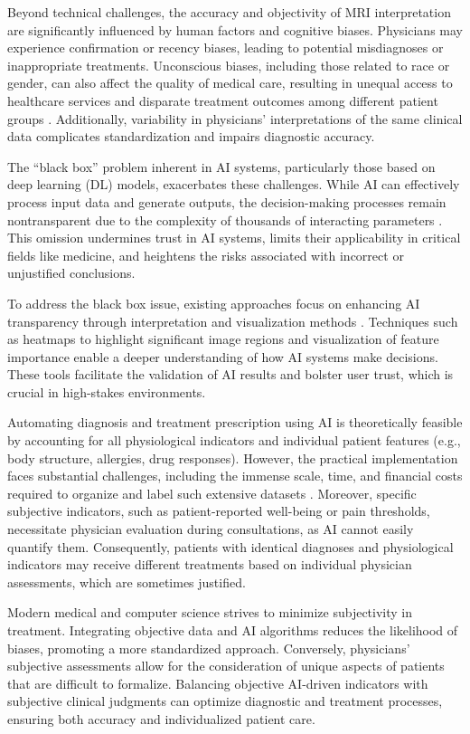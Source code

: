 \documentclass[fleqn,10pt]{wlscirep}
\begin{document}
Beyond technical challenges, the accuracy and objectivity of MRI interpretation are significantly influenced by human factors and cognitive biases. Physicians may experience confirmation or recency biases, leading to potential misdiagnoses or inappropriate treatments. Unconscious biases, including those related to race or gender, can also affect the quality of medical care, resulting in unequal access to healthcare services and disparate treatment outcomes among different patient groups \cite{DeBenedectis:2022,Meidert:2023}. Additionally, variability in physicians’ interpretations of the same clinical data complicates standardization and impairs diagnostic accuracy.

The “black box” problem inherent in AI systems, particularly those based on deep learning (DL) models, exacerbates these challenges. While AI can effectively process input data and generate outputs, the decision-making processes remain nontransparent due to the complexity of thousands of interacting parameters \cite{Radiuk:2024a}. This omission undermines trust in AI systems, limits their applicability in critical fields like medicine, and heightens the risks associated with incorrect or unjustified conclusions.

To address the black box issue, existing approaches focus on enhancing AI transparency through interpretation and visualization methods \cite{Shick:2024}. Techniques such as heatmaps to highlight significant image regions and visualization of feature importance enable a deeper understanding of how AI systems make decisions. These tools facilitate the validation of AI results and bolster user trust, which is crucial in high-stakes environments.

Automating diagnosis and treatment prescription using AI is theoretically feasible by accounting for all physiological indicators and individual patient features (e.g., body structure, allergies, drug responses). However, the practical implementation faces substantial challenges, including the immense scale, time, and financial costs required to organize and label such extensive datasets \cite{Radiuk:2021}. Moreover, specific subjective indicators, such as patient-reported well-being or pain thresholds, necessitate physician evaluation during consultations, as AI cannot easily quantify them. Consequently, patients with identical diagnoses and physiological indicators may receive different treatments based on individual physician assessments, which are sometimes justified.

Modern medical and computer science strives to minimize subjectivity in treatment. Integrating objective data and AI algorithms reduces the likelihood of biases, promoting a more standardized approach. Conversely, physicians’ subjective assessments allow for the consideration of unique aspects of patients that are difficult to formalize. Balancing objective AI-driven indicators with subjective clinical judgments can optimize diagnostic and treatment processes, ensuring both accuracy and individualized patient care.
\end{document}
